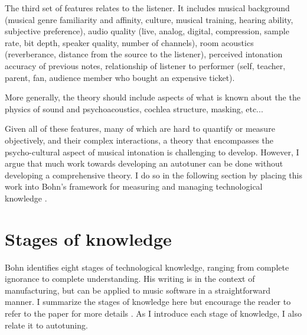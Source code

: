 The third set of features relates to the listener. It includes musical background (musical genre familiarity and affinity, culture, musical training, hearing ability, subjective preference), audio quality (live, analog, digital, compression, sample rate, bit depth, speaker quality, number of channels), room acoustics (reverberance, distance from the source to the listener), perceived intonation accuracy of previous notes, relationship of listener to performer (self, teacher, parent, fan, audience member who bought an expensive ticket).

More generally, the theory should include aspects of what is known about the the physics of sound and psychoacoustics, cochlea structure, masking, etc...

Given all of these features, many of which are hard to quantify or measure objectively, and their complex interactions, a theory that encompasses the psycho-cultural aspect of musical intonation is challenging to develop. However, I argue that much work towards developing an autotuner can be done without developing a comprehensive theory. I do so in the following section by placing this work into Bohn's framework for measuring and managing technological knowledge \cite{bohn1998measuring}.

\section{Stages of knowledge}
Bohn identifies eight stages of technological knowledge, ranging from complete ignorance to complete understanding. His writing is in the context of manufacturing, but can be applied to music software in a straightforward manner. I summarize the stages of knowledge here but encourage the reader to refer to the paper for more details \cite{bohn1998measuring}. As I introduce each stage of knowledge, I also relate it to autotuning.


